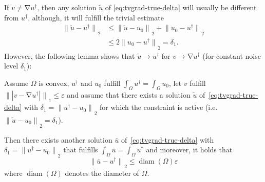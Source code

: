 \documentclass[twocolumn,envcountsame]{svjour3}
\newcommand{\norm}[2][]{{\|{#2}\|_{}}_{#1}}
\newcommand{\abs}[1]{|#1|}
\newcommand{\udag}{u^{\dagger}}
\DeclareMathOperator{\diam}{diam}
\DeclareMathOperator{\grad}{\nabla}
\begin{document}
If $v\neq\grad \udag$, then any solution $\tilde u$ of \eqref{eq:tvgrad-true-delta} will usually be different from $\udag$,
although, it will fulfill the trivial estimate
\begin{align*}
  \norm[2]{\tilde u - \udag} & \leq\norm[2]{\tilde u-u_{0}} + \norm[2]{u_{0}-\udag}\\
                          &\leq 2\norm[2]{u_{0}-\udag} = \delta_1.
\end{align*}
However, the following lemma shows that $\tilde u\to \udag$ for $v\to\grad\udag$ (for constant noise level $\delta_{1}$):
\begin{lemma}
  Assume $\Omega$ is convex, $\udag$ and $u_{0}$ fulfill $\int_{\Omega}\udag = \int_{\Omega}u_{0}$, let $v$
  fulfill $\norm[1]{\abs{v - \grad \udag}}\leq \varepsilon$ and assume
  that there exists a solution $\tilde u$
  of~\eqref{eq:tvgrad-true-delta} with
  $\delta_{1} = \norm[2]{\udag-u_{0}}$ for which the constraint is
  active (i.e.  $\norm[2]{\tilde u-u_{0}} = \delta_{1}$).
  
  Then there exists another solution $\bar u$ of~\eqref{eq:tvgrad-true-delta}
  with $\delta_{1} = \norm[2]{\udag-u_{0}}$ that fulfills
  $\int_{\Omega}\bar u = \int_{\Omega}\udag$ and moreover, it holds
  that
  \[
  \norm[2]{\bar u-\udag}\leq \diam(\Omega)\varepsilon
  \]
  where $\diam(\Omega)$ denotes the diameter of $\Omega$.
\end{lemma}
\end{document}
